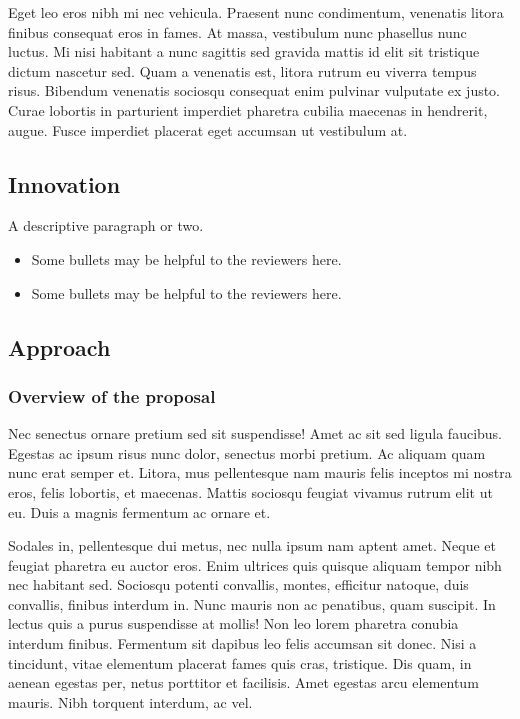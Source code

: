\documentclass[11pt,]{article}
\providecommand{\tightlist}{%
  \setlength{\itemsep}{0pt}\setlength{\parskip}{0pt}}
\begin{document}
Eget leo eros nibh mi nec vehicula. Praesent nunc condimentum, venenatis
litora finibus consequat eros in fames. At massa, vestibulum nunc
phasellus nunc luctus. Mi nisi habitant a nunc sagittis sed gravida
mattis id elit sit tristique dictum nascetur sed. Quam a venenatis est,
litora rutrum eu viverra tempus risus. Bibendum venenatis sociosqu
consequat enim pulvinar vulputate ex justo. Curae lobortis in parturient
imperdiet pharetra cubilia maecenas in hendrerit, augue. Fusce imperdiet
placerat eget accumsan ut vestibulum at.

\hypertarget{innovation}{%
\subsection{Innovation}\label{innovation}}

A descriptive paragraph or two.

\begin{itemize}
\tightlist
\item
  Some bullets may be helpful to the reviewers here.
\item
  Some bullets may be helpful to the reviewers here.
\end{itemize}

\hypertarget{approach}{%
\subsection{Approach}\label{approach}}

\hypertarget{overview-of-the-proposal}{%
\subsubsection{Overview of the
proposal}\label{overview-of-the-proposal}}

Nec senectus ornare pretium sed sit suspendisse! Amet ac sit sed ligula
faucibus. Egestas ac ipsum risus nunc dolor, senectus morbi pretium. Ac
aliquam quam nunc erat semper et. Litora, mus pellentesque nam mauris
felis inceptos mi nostra eros, felis lobortis, et maecenas. Mattis
sociosqu feugiat vivamus rutrum elit ut eu. Duis a magnis fermentum ac
ornare et.

Sodales in, pellentesque dui metus, nec nulla ipsum nam aptent amet.
Neque et feugiat pharetra eu auctor eros. Enim ultrices quis quisque
aliquam tempor nibh nec habitant sed. Sociosqu potenti convallis,
montes, efficitur natoque, duis convallis, finibus interdum in. Nunc
mauris non ac penatibus, quam suscipit. In lectus quis a purus
suspendisse at mollis! Non leo lorem pharetra conubia interdum finibus.
Fermentum sit dapibus leo felis accumsan sit donec. Nisi a tincidunt,
vitae elementum placerat fames quis cras, tristique. Dis quam, in aenean
egestas per, netus porttitor et facilisis. Amet egestas arcu elementum
mauris. Nibh torquent interdum, ac vel.
\end{document}
